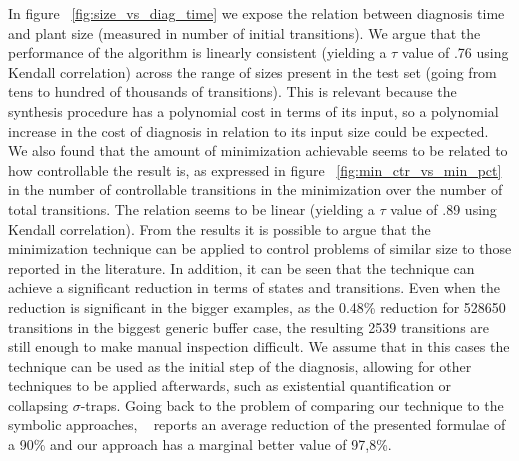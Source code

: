 In figure ~\ref{fig:size_vs_diag_time} we expose the relation between diagnosis time and plant size (measured in number of initial transitions). We argue that the performance of the algorithm is linearly consistent (yielding a $\tau$ value of .76 using Kendall correlation) across the range of sizes present in the test set (going from tens to hundred of thousands of transitions). This is relevant because the synthesis procedure has a polynomial cost in terms of its input, so a polynomial increase in the cost of diagnosis in relation to its input size could be expected. 
We also found that the amount of minimization achievable seems to be related to how controllable the result is, as expressed in figure  ~\ref{fig:min_ctr_vs_min_pct} in the number of controllable transitions in the minimization over the number of total transitions. The relation seems to be linear (yielding a $\tau$ value of .89 using Kendall correlation).
From the results it is possible to argue that the minimization technique can be applied to control problems of similar size to those reported in the literature. 
In addition, it can be seen that the technique can achieve a significant reduction in terms of states and transitions. Even when the reduction is significant in the bigger examples, as the 0.48\% reduction for 528650 transitions in the biggest generic buffer case, the resulting 2539 transitions are still enough to make manual inspection difficult. We assume that in this cases the technique can be used as the initial step of the diagnosis, allowing for other techniques to be applied afterwards, such as existential quantification or collapsing $\sigma$-traps.
Going back to the problem of comparing our technique to the symbolic approaches, ~\cite{DBLP:conf/hvc/KonighoferHB10} reports an average reduction of the presented formulae of a 90\% and our approach has a marginal better value of 97,8\%.

